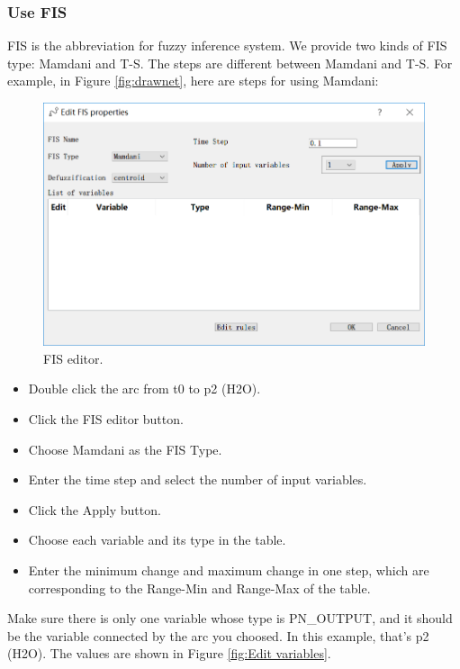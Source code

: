 \documentclass[journal,a4paper,onecolumn]{article}
\begin{document}
\subsubsection{Use FIS}
FIS is the abbreviation for fuzzy inference system. We provide two kinds of FIS type: Mamdani and T-S. The steps are different between Mamdani and T-S. For example, in Figure \ref{fig:drawnet}, here are steps for using Mamdani: 
 \begin{figure}[!hbt]
 	\begin{center}
 		\includegraphics[width=\columnwidth]{fig7}
 		\caption{FIS editor.}
 		\label{fig:FIS editor}
 	\end{center}
 \end{figure}

\begin{itemize}
	\item Double click the arc from t0 to p2 (H2O).
	\item Click the FIS editor button.
	\item Choose Mamdani as the FIS Type.
	\item Enter the time step and select the number of input variables.
	\item Click the Apply button.
	\item Choose each variable and its type in the table.
	\item Enter the minimum change and maximum change in one step, which are corresponding to the Range-Min and Range-Max of the table.
\end{itemize}

Make sure there is only one variable whose type is PN\_OUTPUT, and it should be the variable connected by the arc you choosed. In this example, that's p2 (H2O). The values are shown in Figure \ref{fig:Edit variables}.
\end{document}
